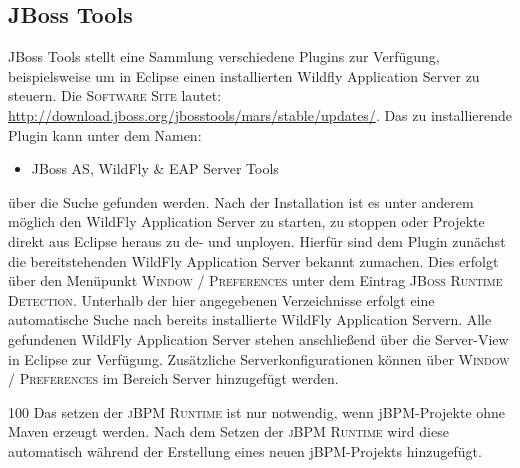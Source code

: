\subsection{JBoss Tools}
JBoss Tools stellt eine Sammlung verschiedene Plugins zur Verfügung, beispielsweise um in Eclipse einen installierten Wildfly Application Server zu steuern. Die \textsc{Software Site} lautet: \url{http://download.jboss.org/jbosstools/mars/stable/updates/}. Das zu installierende Plugin kann unter dem Namen:
\begin{itemize}\renewcommand{\labelitemi}{\itemizecheck}
	\item JBoss AS, WildFly \& EAP Server Tools
\end{itemize}
über die Suche gefunden werden. Nach der Installation ist es unter anderem möglich den WildFly Application Server zu starten, zu stoppen oder Projekte direkt aus Eclipse heraus zu de- und unployen. Hierfür sind dem Plugin zunächst die bereitstehenden WildFly Application Server bekannt zumachen. Dies erfolgt über den Menüpunkt \textsc{Window / Preferences} unter dem Eintrag \textsc{JBoss Runtime Detection}. Unterhalb der hier angegebenen Verzeichnisse erfolgt eine automatische Suche nach bereits installierte WildFly Application Servern. Alle gefundenen WildFly Application Server stehen anschließend über die Server-View in Eclipse zur Verfügung. Zusätzliche Serverkonfigurationen können über \textsc{Window / Preferences} im Bereich Server hinzugefügt werden.
\begin{info}{100}
	Das setzen der \textsc{jBPM Runtime} ist nur notwendig, wenn jBPM-Projekte ohne Maven erzeugt werden. Nach dem Setzen der \textsc{jBPM Runtime} wird diese automatisch während der Erstellung eines neuen jBPM-Projekts hinzugefügt.
\end{info}